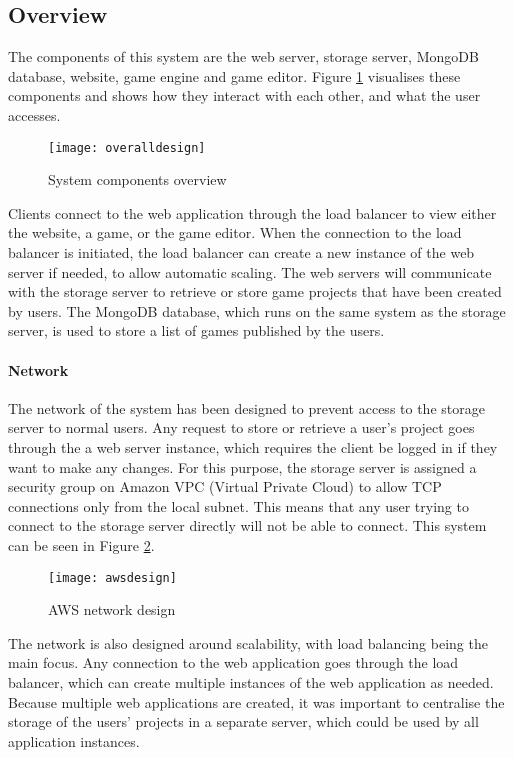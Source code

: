 	\subsection{Overview}
	The components of this system are the web server, storage server, MongoDB database, website, game engine and game editor. Figure \ref{fig:overalldesign} visualises these components and shows how they interact with each other, and what the user accesses.

	\begin{figure}[h]
		\centering
		\texttt{[image: overalldesign]}
		\caption{System components overview}
		\label{fig:overalldesign}
	\end{figure}

	Clients connect to the web application through the load balancer to view either the website, a game, or the game editor. When the connection to the load balancer is initiated, the load balancer can create a new instance of the web server if needed, to allow automatic scaling. The web servers will communicate with the storage server to retrieve or store game projects that have been created by users. The MongoDB database, which runs on the same system as the storage server, is used to store a list of games published by the users.

	\paragraph{Network}
	The network of the system has been designed to prevent access to the storage server to normal users. Any request to store or retrieve a user's project goes through the a web server instance, which requires the client be logged in if they want to make any changes. For this purpose, the storage server is assigned a security group on Amazon VPC (Virtual Private Cloud) to allow TCP connections only from the local subnet.\cite{awsvpc} This means that any user trying to connect to the storage server directly will not be able to connect. This system can be seen in Figure \ref{fig:awsnetworkdesign}.

	\begin{figure}[h]
		\centering
		\texttt{[image: awsdesign]}
		\caption{AWS network design}
		\label{fig:awsnetworkdesign}
	\end{figure}

	The network is also designed around scalability, with load balancing being the main focus. Any connection to the web application goes through the load balancer, which can create multiple instances of the web application as needed. Because multiple web applications are created, it was important to centralise the storage of the users' projects in a separate server, which could be used by all application instances.

